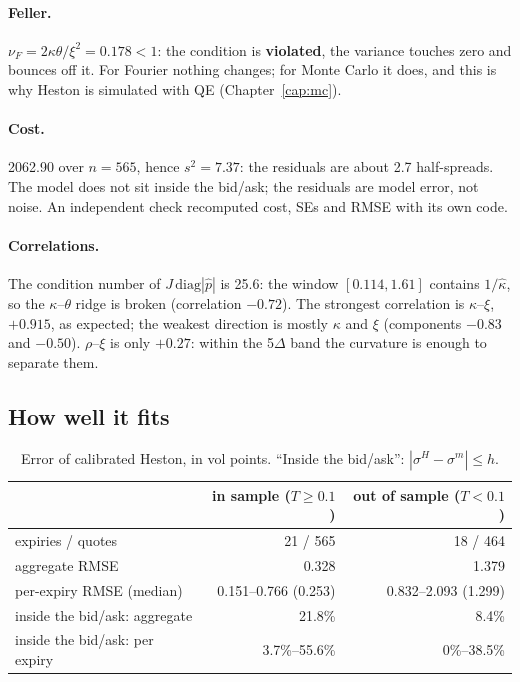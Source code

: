 \paragraph{Feller.} $\nu_F=2\kappa\theta/\xi^2=0.178<1$: the condition is \textbf{violated}, the variance touches zero
and bounces off it. For Fourier nothing changes; for Monte Carlo it does, and this is why Heston is simulated with QE
(Chapter~\ref{cap:mc}).

\paragraph{Cost.} 2062.90 over $n=565$, hence $s^2=7.37$: the residuals are about 2.7 half-spreads. The model does not
sit inside the bid/ask; the residuals are model error, not noise. An independent check recomputed cost, SEs and RMSE
with its own code.

\paragraph{Correlations.} The condition number of $J\,\mathrm{diag}|\hat p|$ is 25.6: the window $[0.114,1.61]$
contains $1/\hat\kappa$, so the $\kappa$--$\theta$ ridge is broken (correlation $-0.72$). The strongest correlation is
$\kappa$--$\xi$, $+0.915$, as expected; the weakest direction is mostly $\kappa$ and $\xi$ (components $-0.83$ and
$-0.50$). $\rho$--$\xi$ is only $+0.27$: within the 5$\Delta$ band the curvature is enough to separate them.

\subsection{How well it fits}
\begin{table}[htbp]
\centering
\small
\caption{Error of calibrated Heston, in vol points. ``Inside the bid/ask'': $|\sigma^H-\sigma^m|\le h$.}
\label{tab:cal-rmse}
\begin{tabularx}{\textwidth}{X r r}
\toprule
& in sample ($T\ge0.1$) & out of sample ($T<0.1$)\\
\midrule
expiries / quotes & 21 / 565 & 18 / 464\\
aggregate RMSE & 0.328 & 1.379\\
per-expiry RMSE (median) & 0.151--0.766 (0.253) & 0.832--2.093 (1.299)\\
inside the bid/ask: aggregate & 21.8\% & 8.4\%\\
inside the bid/ask: per expiry & 3.7\%--55.6\% & 0\%--38.5\%\\
\bottomrule
\end{tabularx}
\end{table}

